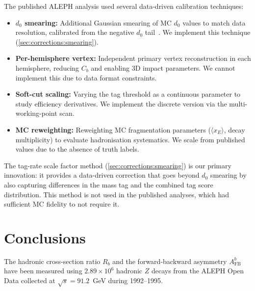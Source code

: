\documentclass[11pt,a4paper]{article}
\begin{document}
The published ALEPH analysis used several data-driven calibration
techniques:
\begin{itemize}
\item \textbf{$d_0$ smearing:} Additional Gaussian smearing of MC
  $d_0$ values to match data resolution, calibrated from the
  negative $d_0$ tail~\cite{ALEPH:Rb:precise}.
  We implement this technique (\cref{sec:corrections:smearing}).
\item \textbf{Per-hemisphere vertex:} Independent primary vertex
  reconstruction in each hemisphere, reducing $C_b$ and enabling
  3D impact parameters.
  We cannot implement this due to data format constraints.
\item \textbf{Soft-cut scaling:} Varying the tag threshold as a
  continuous parameter to study efficiency derivatives.
  We implement the discrete version via the multi-working-point
  scan.
\item \textbf{MC reweighting:} Reweighting MC fragmentation
  parameters ($\langle x_E \rangle$, decay multiplicity) to
  evaluate hadronisation systematics.
  We scale from published values due to the absence of truth
  labels.
\end{itemize}

The tag-rate scale factor method (\cref{sec:corrections:smearing})
is our primary innovation: it provides a data-driven correction
that goes beyond $d_0$ smearing by also capturing differences in
the mass tag and the combined tag score distribution.
This method is not used in the published analyses, which had
sufficient MC fidelity to not require it.

\section{Conclusions}
\label{sec:conclusions}

The hadronic cross-section ratio $R_b$ and the forward-backward
asymmetry $A_\text{FB}^b$ have been measured using $2.89 \times
10^6$ hadronic $Z$ decays from the ALEPH Open Data collected at
$\sqrt{s} = 91.2$~GeV during 1992--1995.
\end{document}
